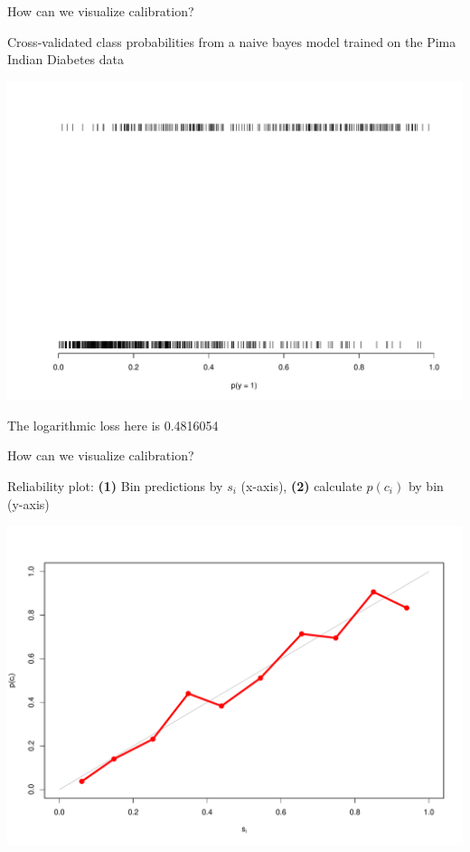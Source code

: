 \documentclass[ignorenonframetext,]{beamer}
\begin{document}
\begin{frame}{How can we visualize calibration?}

Cross-validated class probabilities from a naive bayes model trained on
the Pima Indian Diabetes data

\footnotesize
\includegraphics{presentation_files/figure-beamer/unnamed-chunk-1-1.pdf}

The logarithmic loss here is 0.4816054

\end{frame}

\begin{frame}{How can we visualize calibration?}

Reliability plot: \textbf{(1)} Bin predictions by \(s_i\) (x-axis),
\textbf{(2)} calculate \(p(c_i)\) by bin (y-axis)

\includegraphics{presentation_files/figure-beamer/unnamed-chunk-2-1.pdf}

\end{frame}
\end{document}
